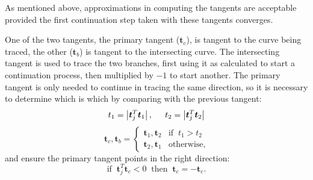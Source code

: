 \documentclass[11pt,openany,twoside]{book}
\numberwithin{equation}{section}		%
\newcommand{\Vector}[1]{\boldsymbol{#1}}
\begin{document}
As mentioned above, approximations in computing the tangents
are acceptable provided the first continuation step taken with
these tangents converges.
\par
One of the two tangents, the primary tangent ($\Vector{t}_c$),
is tangent to the curve being traced, the other ($\Vector{t}_b$) is tangent
to the intersecting curve. The intersecting tangent is used to trace
the two branches, first using it as calculated to start a continuation
process, then multiplied by $-1$ to start another.
The primary tangent is only needed to continue in tracing the same direction,
so it is necessary to determine which is which by comparing with
the previous tangent:
\begin{equation}
\label{eqn:assoc}
t_1 = \left| \Vector{t}_j^T \Vector{t}_1 \right|, \hspace{0.2in}
t_2 = \left| \Vector{t}_j^T \Vector{t}_2 \right| \nonumber
\end{equation}
\begin{equation}
	\Vector{t}_c, \Vector{t}_b = \begin{cases}
		\Vector{t}_1, \Vector{t}_2 & \text{if} \;\;  t_1 > t_2 \\
		\Vector{t}_2, \Vector{t}_1 & \text{otherwise},
	\end{cases}
\end{equation}
and ensure the primary tangent points in the right direction:
\begin{equation}
\label{eqn:tcsign}
\text{if} \;\; \Vector{t}_j^T \Vector{t}_c < 0 \;\; \text{then} \;\; \Vector{t}_c = -\Vector{t}_c.
\end{equation}
\end{document}
